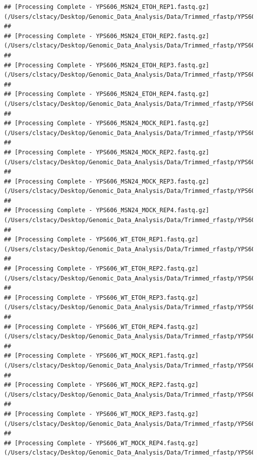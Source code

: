 \documentclass[
]{book}
\begin{document}
\begin{verbatim}
## [Processing Complete - YPS606_MSN24_ETOH_REP1.fastq.gz](/Users/clstacy/Desktop/Genomic_Data_Analysis/Data/Trimmed_rfastp/YPS606_MSN24_ETOH_REP1.fastq.gz)
## 
## [Processing Complete - YPS606_MSN24_ETOH_REP2.fastq.gz](/Users/clstacy/Desktop/Genomic_Data_Analysis/Data/Trimmed_rfastp/YPS606_MSN24_ETOH_REP2.fastq.gz)
## 
## [Processing Complete - YPS606_MSN24_ETOH_REP3.fastq.gz](/Users/clstacy/Desktop/Genomic_Data_Analysis/Data/Trimmed_rfastp/YPS606_MSN24_ETOH_REP3.fastq.gz)
## 
## [Processing Complete - YPS606_MSN24_ETOH_REP4.fastq.gz](/Users/clstacy/Desktop/Genomic_Data_Analysis/Data/Trimmed_rfastp/YPS606_MSN24_ETOH_REP4.fastq.gz)
## 
## [Processing Complete - YPS606_MSN24_MOCK_REP1.fastq.gz](/Users/clstacy/Desktop/Genomic_Data_Analysis/Data/Trimmed_rfastp/YPS606_MSN24_MOCK_REP1.fastq.gz)
## 
## [Processing Complete - YPS606_MSN24_MOCK_REP2.fastq.gz](/Users/clstacy/Desktop/Genomic_Data_Analysis/Data/Trimmed_rfastp/YPS606_MSN24_MOCK_REP2.fastq.gz)
## 
## [Processing Complete - YPS606_MSN24_MOCK_REP3.fastq.gz](/Users/clstacy/Desktop/Genomic_Data_Analysis/Data/Trimmed_rfastp/YPS606_MSN24_MOCK_REP3.fastq.gz)
## 
## [Processing Complete - YPS606_MSN24_MOCK_REP4.fastq.gz](/Users/clstacy/Desktop/Genomic_Data_Analysis/Data/Trimmed_rfastp/YPS606_MSN24_MOCK_REP4.fastq.gz)
## 
## [Processing Complete - YPS606_WT_ETOH_REP1.fastq.gz](/Users/clstacy/Desktop/Genomic_Data_Analysis/Data/Trimmed_rfastp/YPS606_WT_ETOH_REP1.fastq.gz)
## 
## [Processing Complete - YPS606_WT_ETOH_REP2.fastq.gz](/Users/clstacy/Desktop/Genomic_Data_Analysis/Data/Trimmed_rfastp/YPS606_WT_ETOH_REP2.fastq.gz)
## 
## [Processing Complete - YPS606_WT_ETOH_REP3.fastq.gz](/Users/clstacy/Desktop/Genomic_Data_Analysis/Data/Trimmed_rfastp/YPS606_WT_ETOH_REP3.fastq.gz)
## 
## [Processing Complete - YPS606_WT_ETOH_REP4.fastq.gz](/Users/clstacy/Desktop/Genomic_Data_Analysis/Data/Trimmed_rfastp/YPS606_WT_ETOH_REP4.fastq.gz)
## 
## [Processing Complete - YPS606_WT_MOCK_REP1.fastq.gz](/Users/clstacy/Desktop/Genomic_Data_Analysis/Data/Trimmed_rfastp/YPS606_WT_MOCK_REP1.fastq.gz)
## 
## [Processing Complete - YPS606_WT_MOCK_REP2.fastq.gz](/Users/clstacy/Desktop/Genomic_Data_Analysis/Data/Trimmed_rfastp/YPS606_WT_MOCK_REP2.fastq.gz)
## 
## [Processing Complete - YPS606_WT_MOCK_REP3.fastq.gz](/Users/clstacy/Desktop/Genomic_Data_Analysis/Data/Trimmed_rfastp/YPS606_WT_MOCK_REP3.fastq.gz)
## 
## [Processing Complete - YPS606_WT_MOCK_REP4.fastq.gz](/Users/clstacy/Desktop/Genomic_Data_Analysis/Data/Trimmed_rfastp/YPS606_WT_MOCK_REP4.fastq.gz)
\end{verbatim}
\end{document}
